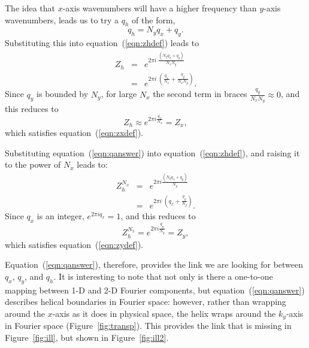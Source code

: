 \par
The idea that $x$-axis wavenumbers will have a higher frequency than
$y$-axis wavenumbers, leads us to try a $q_h$ of the form,
\begin{equation} \label{eqn:qanswer}
q_h = N_y q_x + q_y.
\end{equation}
Substituting this into equation~(\ref{eqn:zhdef}) leads to
\begin{eqnarray}
Z_h & = & e^{2 \pi i \; \frac{(N_y q_x + q_y)}{N_x N_y}} \\
& = & e^{2 \pi i \; \left( \frac{q_x}{N_x} + \frac{q_y}{N_x N_y}
\right)}. 
\end{eqnarray}
Since $q_y$ is bounded by $N_y$, for large $N_x$ the second term in
braces $\frac{q_y}{N_x N_y} \approx 0$, and this 
reduces to 
\begin{equation}
Z_h \approx e^{2 \pi i \frac{q_x}{N_x}} = Z_x,
\end{equation}
which satisfies equation~(\ref{eqn:zxdef}).

\par
Substituting equation~(\ref{eqn:qanswer}) into
equation~(\ref{eqn:zhdef}), and raising it to the power of $N_x$ leads 
to: 
\begin{eqnarray}
Z_h^{N_x} & = & e^{2 \pi i \frac{(N_y q_x + q_y)}{N_y}} \\
& = & e^{2 \pi i \; \left( q_x + \frac{q_y}{N_y} \right)}.
\end{eqnarray}
Since $q_x$ is an integer, $e^{2 \pi i q_x} = 1$, and this reduces to  
\begin{equation}
Z_h^{N_x} = e^{2 \pi i \frac{q_y}{N_y}} = Z_y,
\end{equation}
which satisfies equation~(\ref{eqn:zydef}).

\par
Equation~(\ref{eqn:qanswer}), therefore, provides the link we are
looking for between $q_x$, $q_y$, and $q_h$.  It is interesting to
note that not only is there a one-to-one mapping between 1-D and 2-D 
Fourier components, but equation~(\ref{eqn:qanswer}) describes helical
boundaries in Fourier space: however, rather than wrapping around the
$x$-axis as it does in physical space, the helix wraps around the
$k_y$-axis in Fourier space (Figure~\ref{fig:transp}).  This provides 
the link that is missing in Figure~\ref{fig:ill}, but shown in
Figure~\ref{fig:ill2}. 

